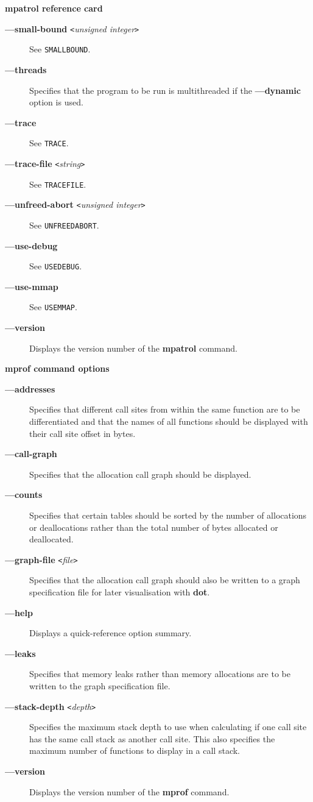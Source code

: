 \documentclass[a4paper,landscape,final]{article}
\newcommand{\heading}[1]{\textbf{\normalsize #1}}
\newcommand{\command}[1]{\textbf{#1}}
\newcommand{\flag}[1]{\textbf{---#1}}
\newcommand{\flagpar}[2]{\flag{#1} \texttt{<}\textit{#2}\texttt{>}}
\newcommand{\option}[1]{\texttt{#1}}
\begin{document}
\begin{multicols}{3}{\textbf{\Large mpatrol reference card}}
\begin{description}
\item[\flagpar{small-bound}{unsigned integer}]
\hfill See \option{SMALLBOUND}.
\item[\flag{threads}]
Specifies that the program to be run is multithreaded if the \flag{dynamic}
option is used.
\item[\flag{trace}]
\hfill See \option{TRACE}.
\item[\flagpar{trace-file}{string}]
\hfill See \option{TRACEFILE}.
\item[\flagpar{unfreed-abort}{unsigned integer}]
\hfill See \option{UNFREEDABORT}.
\item[\flag{use-debug}]
\hfill See \option{USEDEBUG}.
\item[\flag{use-mmap}]
\hfill See \option{USEMMAP}.
\item[\flag{version}]
Displays the version number of the \command{mpatrol} command.
\end{description}

\vskip 12pt
\heading{mprof command options}
\vskip 6pt

\begin{description}
\item[\flag{addresses}]
Specifies that different call sites from within the same function are to be
differentiated and that the names of all functions should be displayed with
their call site offset in bytes.
\item[\flag{call-graph}]
Specifies that the allocation call graph should be displayed.
\item[\flag{counts}]
Specifies that certain tables should be sorted by the number of allocations or
deallocations rather than the total number of bytes allocated or deallocated.
\item[\flagpar{graph-file}{file}]
Specifies that the allocation call graph should also be written to a graph
specification file for later visualisation with \command{dot}.
\item[\flag{help}]
Displays a quick-reference option summary.
\item[\flag{leaks}]
Specifies that memory leaks rather than memory allocations are to be written to
the graph specification file.
\item[\flagpar{stack-depth}{depth}]
Specifies the maximum stack depth to use when calculating if one call site has
the same call stack as another call site.  This also specifies the maximum
number of functions to display in a call stack.
\item[\flag{version}]
Displays the version number of the \command{mprof} command.
\end{description}


\end{multicols}
\end{document}
